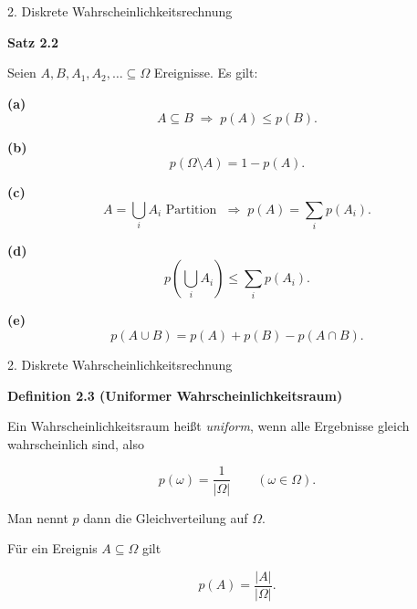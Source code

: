 \documentclass{beamer}
\begin{document}
\begin{frame}{2. Diskrete Wahrscheinlichkeitsrechnung}

\textbf{Satz 2.2}

\vspace{0.2cm}

Seien \(A,B,A_1,A_2,\ldots\subseteq\Omega\) Ereignisse. Es gilt:

\textbf{(a)}
\[
A\subseteq B \;\Longrightarrow\; p(A)\leq p(B).
\]

\textbf{(b)}
\[
p(\Omega\setminus A)=1-p(A).
\]

\textbf{(c)}
\[
A=\bigcup_i A_i \text{ Partition }
\;\Longrightarrow\;
p(A)=\sum_i p(A_i).
\]

\textbf{(d)}
\[
p\!\left(\bigcup_i A_i\right)
\leq
\sum_i p(A_i).
\]

\textbf{(e)}
\[
p(A\cup B)=p(A)+p(B)-p(A\cap B).
\]

\end{frame}

\begin{frame}{2. Diskrete Wahrscheinlichkeitsrechnung}

\textbf{Definition 2.3 (Uniformer Wahrscheinlichkeitsraum)}

\vspace{0.3cm}

Ein Wahrscheinlichkeitsraum heißt \emph{uniform}, wenn alle Ergebnisse gleich wahrscheinlich sind, also

\[
p(\omega)=\frac{1}{|\Omega|}
\qquad (\omega\in\Omega).
\]

\vspace{0.3cm}

Man nennt \(p\) dann die Gleichverteilung auf \(\Omega\).

\vspace{0.3cm}

Für ein Ereignis \(A\subseteq\Omega\) gilt

\[
p(A)=\frac{|A|}{|\Omega|}.
\]

\end{frame}
\end{document}
